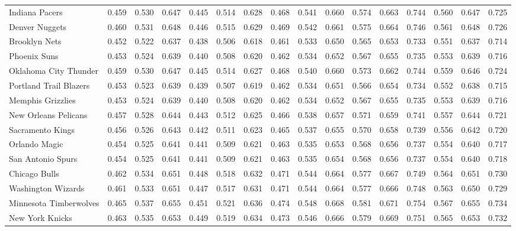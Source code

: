\documentclass[11pt,a4paper]{article}
\begin{document}
\begin{table}[H]
\begin{tabular}{l ccc ccc ccc ccc ccc}
Indiana Pacers & 0.459 & 0.530 & 0.647 & 0.445 & 0.514 & 0.628 & 0.468 & 0.541 & 0.660 & 0.574 & 0.663 & 0.744 & 0.560 & 0.647 & 0.725 \\
Denver Nuggets & 0.460 & 0.531 & 0.648 & 0.446 & 0.515 & 0.629 & 0.469 & 0.542 & 0.661 & 0.575 & 0.664 & 0.746 & 0.561 & 0.648 & 0.726 \\
Brooklyn Nets & 0.452 & 0.522 & 0.637 & 0.438 & 0.506 & 0.618 & 0.461 & 0.533 & 0.650 & 0.565 & 0.653 & 0.733 & 0.551 & 0.637 & 0.714 \\
Phoenix Suns & 0.453 & 0.524 & 0.639 & 0.440 & 0.508 & 0.620 & 0.462 & 0.534 & 0.652 & 0.567 & 0.655 & 0.735 & 0.553 & 0.639 & 0.716 \\
Oklahoma City Thunder & 0.459 & 0.530 & 0.647 & 0.445 & 0.514 & 0.627 & 0.468 & 0.540 & 0.660 & 0.573 & 0.662 & 0.744 & 0.559 & 0.646 & 0.724 \\
Portland Trail Blazers & 0.453 & 0.523 & 0.639 & 0.439 & 0.507 & 0.619 & 0.462 & 0.534 & 0.651 & 0.566 & 0.654 & 0.734 & 0.552 & 0.638 & 0.715 \\
Memphis Grizzlies & 0.453 & 0.524 & 0.639 & 0.440 & 0.508 & 0.620 & 0.462 & 0.534 & 0.652 & 0.567 & 0.655 & 0.735 & 0.553 & 0.639 & 0.716 \\
New Orleans Pelicans & 0.457 & 0.528 & 0.644 & 0.443 & 0.512 & 0.625 & 0.466 & 0.538 & 0.657 & 0.571 & 0.659 & 0.741 & 0.557 & 0.644 & 0.721 \\
Sacramento Kings & 0.456 & 0.526 & 0.643 & 0.442 & 0.511 & 0.623 & 0.465 & 0.537 & 0.655 & 0.570 & 0.658 & 0.739 & 0.556 & 0.642 & 0.720 \\
Orlando Magic & 0.454 & 0.525 & 0.641 & 0.441 & 0.509 & 0.621 & 0.463 & 0.535 & 0.653 & 0.568 & 0.656 & 0.737 & 0.554 & 0.640 & 0.717 \\
San Antonio Spurs & 0.454 & 0.525 & 0.641 & 0.441 & 0.509 & 0.621 & 0.463 & 0.535 & 0.654 & 0.568 & 0.656 & 0.737 & 0.554 & 0.640 & 0.718 \\
Chicago Bulls & 0.462 & 0.534 & 0.651 & 0.448 & 0.518 & 0.632 & 0.471 & 0.544 & 0.664 & 0.577 & 0.667 & 0.749 & 0.564 & 0.651 & 0.730 \\
Washington Wizards & 0.461 & 0.533 & 0.651 & 0.447 & 0.517 & 0.631 & 0.471 & 0.544 & 0.664 & 0.577 & 0.666 & 0.748 & 0.563 & 0.650 & 0.729 \\
Minnesota Timberwolves & 0.465 & 0.537 & 0.655 & 0.451 & 0.521 & 0.636 & 0.474 & 0.548 & 0.668 & 0.581 & 0.671 & 0.754 & 0.567 & 0.655 & 0.734 \\
New York Knicks & 0.463 & 0.535 & 0.653 & 0.449 & 0.519 & 0.634 & 0.473 & 0.546 & 0.666 & 0.579 & 0.669 & 0.751 & 0.565 & 0.653 & 0.732 \\

\end{tabular}
\end{table}
\end{document}
